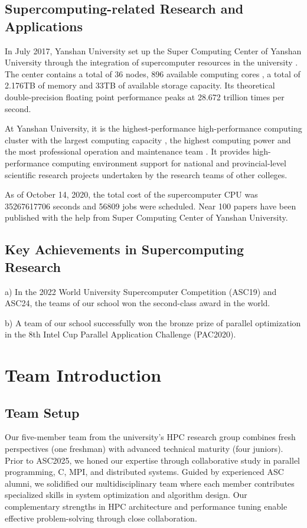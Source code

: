 \documentclass[a4paper,12pt]{article}
\begin{document}
\subsection{Supercomputing-related Research and Applications}

In July 2017, Yanshan University set up the Super Computing Center of Yanshan University through the integration of supercomputer resources in the university . The center contains a total of 36 nodes, 896 available computing cores , a total of 2.176TB of memory and 33TB of available storage capacity. Its theoretical double-precision floating point performance peaks at 28.672 trillion times per second. 

At Yanshan University, it is the highest-performance high-performance computing cluster with the largest computing capacity , the highest computing power and the most professional operation and maintenance team . It provides high-performance computing environment support for national and provincial-level scientific research projects undertaken by the research teams of other colleges.

As of October 14, 2020, the total cost of the supercomputer CPU was 35267617706 seconds and 56809 jobs were scheduled. Near 100 papers have been published with the help from Super Computing Center of Yanshan University.

\subsection{Key Achievements in Supercomputing Research}

a) In the 2022 World University Supercomputer Competition (ASC19) and ASC24, the teams of our school won the second-class award in the world.

b) A team of our school successfully won the bronze prize of parallel optimization in the 8th Intel Cup Parallel Application Challenge (PAC2020).

\newpage

\section{Team Introduction}

\subsection{Team Setup}

Our five-member team from the university's HPC research group combines fresh perspectives (one freshman) with advanced technical maturity (four juniors). Prior to ASC2025, we honed our expertise through collaborative study in parallel programming, C, MPI, and distributed systems. Guided by experienced ASC alumni, we solidified our multidisciplinary team where each member contributes specialized skills in system optimization and algorithm design. Our complementary strengths in HPC architecture and performance tuning enable effective problem-solving through close collaboration.
\end{document}
